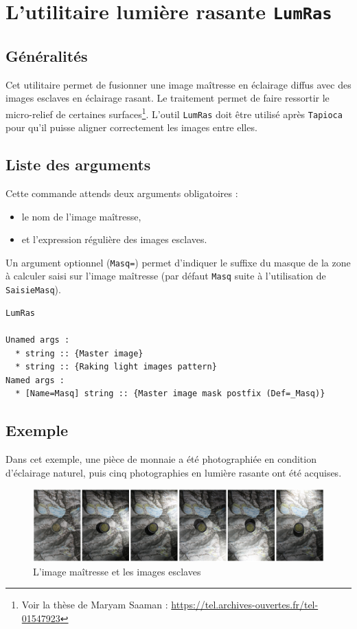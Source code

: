\section{L'utilitaire lumi\`ere rasante {\tt LumRas}}

\subsection{G\'en\'eralit\'es}
Cet utilitaire permet de fusionner une image ma\^itresse en \'eclairage diffus avec des images esclaves en \'eclairage rasant. Le traitement permet de faire ressortir le micro-relief de certaines surfaces\footnote{Voir la th\`ese de Maryam Saaman : \url{https://tel.archives-ouvertes.fr/tel-01547923}}. L'outil {\tt LumRas} doit \^etre utilis\'e apr\`es {\tt Tapioca} pour qu'il puisse aligner correctement les images entre elles.

\subsection{Liste des arguments}
Cette commande attends deux arguments obligatoires :
\begin{itemize}
\item le nom de l'image ma\^itresse,
\item et l'expression r\'eguli\`ere des images esclaves.
\end{itemize}
Un argument optionnel ({\tt Masq=}) permet d'indiquer le suffixe du masque de la zone \`a calculer saisi sur l'image ma\^itresse (par d\'efaut {\tt Masq} suite \`a l'utilisation de {\tt SaisieMasq}).

\begin{verbatim}
LumRas

Unamed args :
  * string :: {Master image}
  * string :: {Raking light images pattern}
Named args :
  * [Name=Masq] string :: {Master image mask postfix (Def=_Masq)}

\end{verbatim}

\subsection{Exemple}
Dans cet exemple, une pi\`ece de monnaie a \'et\'e photographi\'ee en condition d'\'eclairage naturel, puis cinq photographies en lumi\`ere rasante ont \'et\'e acquises.

\begin{figure}[h!]
\centering
\includegraphics[width=\textwidth]{FIGS/LumRas/LumRasPanel.png}
\caption{L'image ma\^itresse et les images esclaves}
\end{figure}

